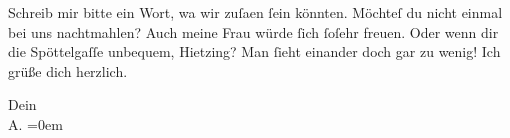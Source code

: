 \pstart
           Schreib mir bitte ein Wort, wa{\geminationn} wir zuſa{\geminationm}en{ }ſein könnten. Möchteſ du nicht einmal bei uns nachtmahlen? Auch meine Frau würde{ }ſich{ }ſoſehr freuen. Oder wenn dir
               die Spöttelgaſſe unbe{\pb}quem, Hietzing? Man{ }ſieht einander doch gar zu wenig! Ich grüße dich
               herzlich.\pend
           
\pstart
           Dein{\\[\baselineskip]}\spacefill\mbox{A.}\pend
           \leftskip=0em{}\endnumbering{}  \newcommand{\dateiname}{L01547}\newcommand{\titel}{Arthur Schnitzler an Hermann Bahr, 17. 9. 1905}\newcommand{\editorInnen}{Herausgegeben von Martin Anton Müller}
